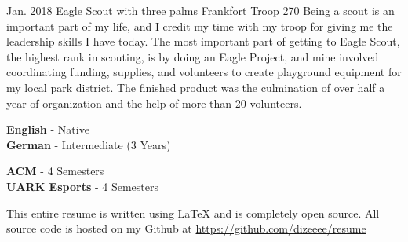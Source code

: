 \documentclass[9pt]{developercv} %
\begin{document}

\begin{entrylist}
	\entry
		{Jan. 2018}
		{Eagle Scout with three palms}
		{Frankfort Troop 270}
		{Being a scout is an important part of my life, and I credit my time with my troop for giving me the leadership skills I have today. The most important part of getting to Eagle Scout, the highest rank in scouting, is by doing an Eagle Project, and mine involved coordinating funding, supplies, and volunteers to create playground equipment for my local park district. The finished product was the culmination of over half a year of organization and the help of more than 20 volunteers.}
\end{entrylist}

\begin{minipage}[t]{0.3\textwidth}
	\vspace{-\baselineskip} %

	
	\textbf{English} - Native\\
	\textbf{German} - Intermediate (3 Years)\\
\end{minipage}
\hfill
\begin{minipage}[t]{0.25\textwidth}
	\vspace{-\baselineskip} %
	
	
	\textbf{ACM} - 4 Semesters\\
	\textbf{UARK Esports} - 4 Semesters\\
\end{minipage}
\hfill
\begin{minipage}[t]{0.4\textwidth}
	\vspace{-\baselineskip} %
	
	
	This entire resume is written using LaTeX and is completely open source. All source code is hosted on my Github at \href{https://www.github.com/Dizeeee/resume}{https://github.com/dizeeee/resume}
\end{minipage}

\end{document}
